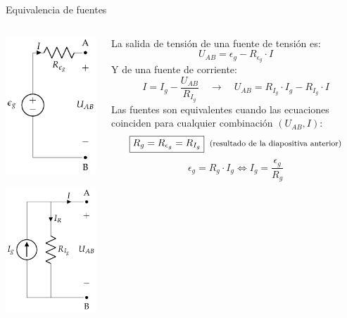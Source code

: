 \documentclass[aspectratio=169, xcolor={usenames,svgnames,dvipsnames}]{beamer}
\begin{document}

\begin{frame}{Equivalencia de fuentes} \label{diapo:transformacion_fuentes}
    \begin{columns}
    \begin{column}{0.25\columnwidth}
        \begin{center}
        \includegraphics[height=0.43\textheight]{../figs/FuenteTensionRealDC.pdf}
        \end{center}
    
        \begin{center}
        \includegraphics[height=0.43\textheight]{../figs/FuenteCorrienteRealDC.pdf}
        \end{center}
    \end{column}
    
    \begin{column}{0.75\columnwidth}
        La salida de tensión de una fuente de tensión es:
        \[
          U_{AB} = \epsilon_g - R_{\epsilon_g} \cdot I
        \]
        Y de una fuente de corriente:
        \[
          I = I_g - \frac{U_{AB}}{R_{I_g}} \quad \rightarrow \quad U_{AB} = R_{I_g} \cdot I_g - R_{I_g} \cdot I
        \]
        Las \alert{fuentes son equivalentes cuando} las ecuaciones coinciden para cualquier combinación \((U_{AB}, I)\):
        \[
            \boxed{R_g = R_{\epsilon_g} = R_{I_g}} \;\; \textrm{\footnotesize{(resultado de la diapositiva anterior)}}
        \]
        \[
          \boxed{\epsilon_g = R_g \cdot I_g} \Leftrightarrow \boxed{I_g = \frac{\epsilon_g}{R_g}}
        \]
    \end{column}
    \end{columns}
\end{frame}
\end{document}
